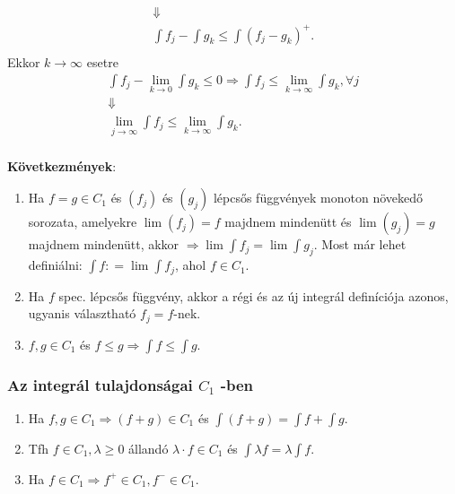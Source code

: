 \documentclass[12pt,a4paper]{scrartcl}
\providecommand{\tightlist}{%
  \setlength{\itemsep}{0pt}\setlength{\parskip}{0pt}}
\newenvironment{bizonyitas}{}{}
\begin{document}
\begin{bizonyitas}
\[\begin{gathered}
   \Downarrow  \\ 
  \int {{f_j}}  - \int {{g_k}}  \leqslant \int {{{\left( {{f_j} - {g_k}} \right)}^ + }}.  \\ 
\end{gathered} \]Ekkor \(\left. k\rightarrow\infty \right.\) esetre
\[\begin{gathered}
  \int {{f_j}}  - \mathop {\lim }\limits_{k \to 0} \int {{g_k}}  \leqslant 0 \Rightarrow \int {{f_j}}  \leqslant \mathop {\lim }\limits_{k \to \infty } \int {{g_k}} ,\forall j \\ 
   \Downarrow  \\ 
  \mathop {\lim }\limits_{j \to \infty } \int {{f_j}}  \leqslant \mathop {\lim }\limits_{k \to \infty } \int {{g_k}}.  \\ 
\end{gathered} \]

\end{bizonyitas}

\textbf{Következmények}:

\begin{enumerate}
\def\labelenumi{\arabic{enumi}.}
\tightlist
\item
  Ha \(f = g \in C_{1}\) és \(\left( f_{j} \right)\) és
  \(\left( g_{j} \right)\) lépcsős függvények monoton növekedő sorozata,
  amelyekre \(\lim\left( f_{j} \right) = f\) majdnem mindenütt és
  \(\lim\left( g_{j} \right) = g\) majdnem mindenütt, akkor
  \(\left. \Rightarrow\lim{\int f_{j}} = \lim{\int g_{j}} \right.\).
  Most már lehet definiálni: \({\int f}: = \lim{\int f_{j}}\), ahol
  \(f \in C_{1}\).
\item
  Ha \(f\) spec. lépcsős függvény, akkor a régi és az új integrál
  definíciója azonos, ugyanis választható \(f_{j} = f\)-nek.
\item
  \(f,g \in C_{1}\) és
  \(\left. f \leq g\Rightarrow{\int f} \leq {\int g} \right.\).
\end{enumerate}

\hypertarget{az-integral-tulajdonsagai-c_1--ben}{%
\subsubsection{\texorpdfstring{Az integrál tulajdonságai \(C_{1}\)
-ben}{Az integrál tulajdonságai C\_\{1\} -ben}}\label{az-integral-tulajdonsagai-c_1--ben}}

\begin{enumerate}
\def\labelenumi{\arabic{enumi}.}
\tightlist
\item
  Ha
  \(\left. f,g \in C_{1}\Rightarrow\left( {f + g} \right) \in C_{1} \right.\)
  és \({\int\left( {f + g} \right)} = {\int f} + {\int g}\).
\item
  Tfh \(f \in C_{1},\lambda \geq 0\) állandó
  \(\lambda \cdot f \in C_{1}\) és
  \({\int{\lambda f}} = \lambda{\int f}\).
\item
  Ha
  \(\left. f \in C_{1}\Rightarrow f^{+} \in C_{1},f^{-} \in C_{1} \right.\).
\end{enumerate}
\end{document}
